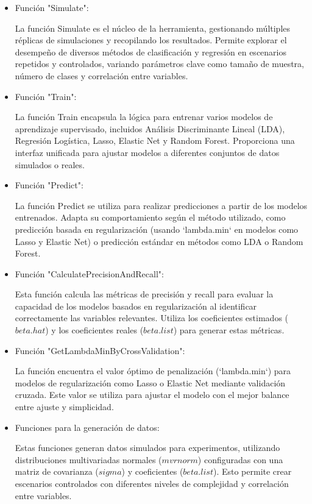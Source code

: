 \documentclass{report}
\begin{document}
\begin{itemize}
\item Función "Simulate":  

La función Simulate es el núcleo de la herramienta, gestionando múltiples réplicas de simulaciones y recopilando los resultados. Permite explorar el desempeño de diversos métodos de clasificación y regresión en escenarios repetidos y controlados, variando parámetros clave como tamaño de muestra, número de clases y correlación entre variables.

\item Función "Train":
 
La función Train encapsula la lógica para entrenar varios modelos de aprendizaje supervisado, incluidos Análisis Discriminante Lineal (LDA), Regresión Logística, Lasso, Elastic Net y Random Forest. Proporciona una interfaz unificada para ajustar modelos a diferentes conjuntos de datos simulados o reales.

\item Función "Predict":  

La función Predict se utiliza para realizar predicciones a partir de los modelos entrenados. Adapta su comportamiento según el método utilizado, como predicción basada en regularización (usando `lambda.min` en modelos como Lasso y Elastic Net) o predicción estándar en métodos como LDA o Random Forest.

\item Función "CalculatePrecisionAndRecall":  

Esta función calcula las métricas de precisión y recall para evaluar la capacidad de los modelos basados en regularización al identificar correctamente las variables relevantes. Utiliza los coeficientes estimados ($beta.hat$) y los coeficientes reales ($beta.list$) para generar estas métricas.

\item Función "GetLambdaMinByCrossValidation":  

La función encuentra el valor óptimo de penalización (`lambda.min`) para modelos de regularización como Lasso o Elastic Net mediante validación cruzada. Este valor se utiliza para ajustar el modelo con el mejor balance entre ajuste y simplicidad.

\item Funciones para la generación de datos:  

Estas funciones generan datos simulados para experimentos, utilizando distribuciones multivariadas normales ($mvrnorm$) configuradas con una matriz de covarianza ($sigma$) y coeficientes ($beta.list$). Esto permite crear escenarios controlados con diferentes niveles de complejidad y correlación entre variables.


\end{itemize}
\end{document}

